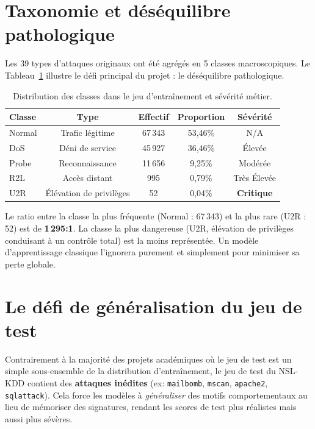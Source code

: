 \documentclass[12pt,a4paper]{report}
\begin{document}
\section{Taxonomie et déséquilibre pathologique}

Les 39 types d'attaques originaux ont été agrégés en 5 classes macroscopiques. Le Tableau~\ref{tab:desequilibre} illustre le défi principal du projet : le déséquilibre pathologique.

\begin{table}[H]
    \centering
    \begin{tabular}{lcccc}
        \toprule
        \textbf{Classe} & \textbf{Type} & \textbf{Effectif} & \textbf{Proportion} & \textbf{Sévérité} \\
        \midrule
        Normal & Trafic légitime & 67\,343 & 53,46\% & N/A \\
        DoS & Déni de service & 45\,927 & 36,46\% & Élevée \\
        Probe & Reconnaissance & 11\,656 & 9,25\% & Modérée \\
        R2L & Accès distant & 995 & 0,79\% & Très Élevée \\
        U2R & Élévation de privilèges & 52 & 0,04\% & \textbf{Critique} \\
        \bottomrule
    \end{tabular}
    \caption{Distribution des classes dans le jeu d'entraînement et sévérité métier.}
    \label{tab:desequilibre}
\end{table}

Le ratio entre la classe la plus fréquente (Normal : 67\,343) et la plus rare (U2R : 52) est de \textbf{1\,295:1}. La classe la plus dangereuse (U2R, élévation de privilèges conduisant à un contrôle total) est la moins représentée. Un modèle d'apprentissage classique l'ignorera purement et simplement pour minimiser sa perte globale.

\section{Le défi de généralisation du jeu de test}

Contrairement à la majorité des projets académiques où le jeu de test est un simple sous-ensemble de la distribution d'entraînement, le jeu de test du NSL-KDD contient des \textbf{attaques inédites} (ex: \texttt{mailbomb}, \texttt{mscan}, \texttt{apache2}, \texttt{sqlattack}). Cela force les modèles à \textit{généraliser} des motifs comportementaux au lieu de mémoriser des signatures, rendant les scores de test plus réalistes mais aussi plus sévères.
\end{document}
